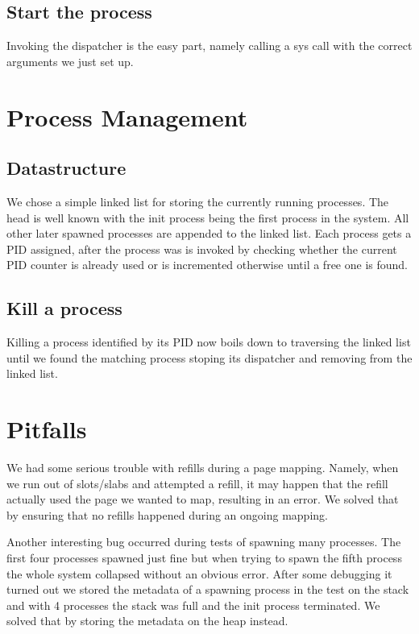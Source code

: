 \subsection{Start the process} 

Invoking the dispatcher is the easy part, namely
calling a sys call with the correct arguments we just set up.

\section{Process Management}

\subsection{Datastructure} 

We chose a simple linked list for storing the
currently running processes. The head is well known with the init process being
the first process in the system.  All other later spawned processes are appended
to the linked list.  Each process gets a PID assigned, after the process was is
invoked by checking whether the current PID counter is already used or is
incremented otherwise until a free one is found.

\subsection{Kill a process} 

Killing a process identified by its PID now boils
down to traversing the linked list until we found the matching process stoping
its dispatcher and removing from the linked list.


\section{Pitfalls} 

We had some serious trouble with refills during a page
mapping. Namely, when we run out of slots/slabs and attempted a refill, it may
happen that the refill actually used the page we wanted to map, resulting in an
error. We solved that by ensuring that no refills happened during an ongoing
mapping.

Another interesting bug occurred during tests of spawning many processes. The
first four processes spawned just fine but when trying to spawn the fifth process
the whole system collapsed without an obvious error. After some debugging it
turned out we stored the metadata of a spawning process in the test on the stack
and with 4 processes the stack was full and the init process terminated. We
solved that by storing the metadata on the heap instead.


